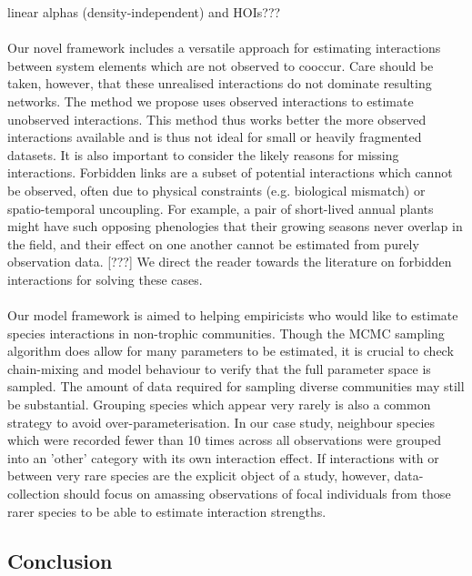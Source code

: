 \documentclass[a4,12pt]{article}
\begin{document}
   linear alphas (density-independent) and HOIs???
        
        \paragraph{}
        Our novel framework includes a versatile approach for estimating interactions between system elements which are not observed to cooccur. Care should be taken, however, that these unrealised interactions do not dominate resulting networks. The method we propose uses observed interactions to estimate unobserved interactions. This method thus works better the more observed interactions available and is thus not ideal for small or heavily fragmented datasets. It is also important to consider the likely reasons for missing interactions. Forbidden links are a subset of potential interactions which cannot be observed, often due to physical constraints (e.g. biological mismatch) or spatio-temporal uncoupling. For example, a pair of short-lived annual plants might have such opposing phenologies that their growing seasons never overlap in the field, and their effect on one another cannot be estimated from purely observation data. [???] We direct the reader towards the literature on forbidden interactions \parencite{Olesen2011, Jordano2016} for solving these cases. 

        \paragraph{}
        Our model framework is aimed to helping empiricists who would like to estimate species interactions in non-trophic communities. Though the MCMC sampling algorithm does allow for many parameters to be estimated, it is crucial to check chain-mixing and model behaviour to verify that the full parameter space is sampled. The amount of data required for sampling diverse communities may still be substantial. Grouping species which appear very rarely is also a common strategy to avoid over-parameterisation. In our case study, neighbour species which were recorded fewer than 10 times across all observations were grouped into an 'other' category with its own interaction effect. If interactions with or between very rare species are the explicit object of a study, however, data-collection should focus on amassing observations of focal individuals from those rarer species to be able to estimate  interaction strengths.   

\subsection{Conclusion}
\end{document}
